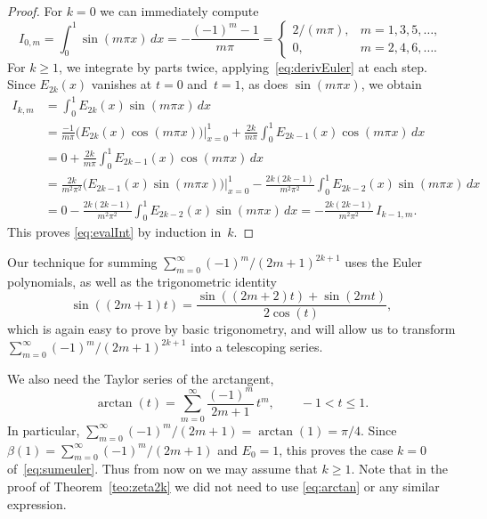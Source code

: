 \documentclass[11pt, oneside]{article}
\theoremstyle{plain}
\theoremstyle{definition}
\begin{document}
\begin{proof}
For $k=0$ we can immediately compute
\[
  I_{0,m} = \int_0^{1} \sin(m\pi x)\,dx = -\frac{(-1)^m-1}{m\pi}
  =
  \begin{cases}
  2/(m\pi), & m= 1,3,5,\dots,\\
  0, & m= 2,4,6,\dots.
  \end{cases}
\]
For $k \ge 1$, we integrate by parts twice, applying~\eqref{eq:derivEuler} at each step. Since $E_{2k}(x)$ vanishes at $t=0$ and~$t=1$, as does $\sin(m \pi x)$, we obtain
\begin{align*}
  I_{k,m} &= \int_0^{1} E_{2k}(x) \sin(m\pi x)\,dx \\
  &= \frac{-1}{m\pi} \Big(E_{2k}(x) \cos(m \pi x) \Big)\Big|_{x=0}^{1}
  + \frac{2k}{m\pi} \int_0^{1} E_{2k-1}(x) \cos(m\pi x)\,dx \\
  &= 0 + \frac{2k}{m\pi} \int_0^{1} E_{2k-1}(x) \cos(m\pi x)\,dx \\
  &= \frac{2k}{m^{2} \pi^{2}} \Big(E_{2k-1}(x) \sin(m \pi x) \Big)\Big|_{x=0}^{1}
  - \frac{2k(2k-1)}{m^2\pi^2} \int_0^{1} E_{2k-2}(x) \sin(m\pi x)\,dx \\
  &= 0 - \frac{2k(2k-1)}{m^2\pi^2} \int_0^{1} E_{2k-2}(x) \sin(m\pi x)\,dx
  = - \frac{2k(2k-1)}{m^2\pi^2} \, I_{k-1,m}.
\end{align*}
This proves \eqref{eq:evalInt} by induction in~$k$.
\end{proof}

Our technique for summing $\sum_{m=0}^{\infty} (-1)^{m}/(2m+1)^{2k+1}$ uses the Euler polynomials, as well as the trigonometric identity
\begin{equation}
\label{eq:idtrigEuler}
  \sin((2m+1)t) = \frac{\sin((2m+2)t)+\sin(2mt)}{2\cos(t)},
\end{equation}
which is again easy to prove by basic trigonometry, and will allow us to transform
$\sum_{m=0}^{\infty} (-1)^{m}/(2m+1)^{2k+1}$ into a telescoping series.

We also need the Taylor series of the arctangent,
\begin{equation}
\label{eq:arctan}
  \arctan(t) = \sum_{m=0}^{\infty} \frac{(-1)^m}{2m+1} \,t^m,
  \qquad -1 < t \le 1.
\end{equation}
In particular, $\sum_{m=0}^{\infty} (-1)^{m}/(2m+1) = \arctan(1) = \pi/4$.
Since $\beta(1) = \sum_{m=0}^{\infty} (-1)^{m}/(2m+1)$ and $E_0=1$, this proves the case $k=0$ of~\eqref{eq:sumeuler}. Thus from now on we may assume that $k \ge 1$.
Note that in the proof of Theorem~\ref{teo:zeta2k} we did not need to use \eqref{eq:arctan} or any similar expression.
\end{document}
